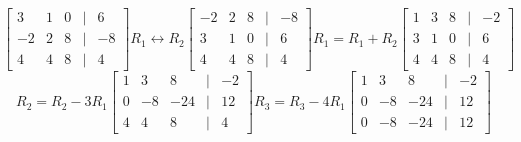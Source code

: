 \documentclass[11pt]{article}
\begin{document}
\begin{enumerate}
\begin{enumerate}
    \[
        \begin{bmatrix}
            3 & 1 & 0 &|& 6 \\
            -2 & 2 & 8 &|& -8 \\
            4 & 4 & 8 & |&4
        \end{bmatrix}
        R_1 \leftrightarrow R_2
        \begin{bmatrix}
            -2 & 2 & 8 &|& -8 \\
            3 & 1 & 0 &|& 6 \\
            4 & 4 & 8 & |&4
        \end{bmatrix}
        R_1 = R_1 + R_2
        \begin{bmatrix}
            1 & 3 & 8 &|& -2 \\
            3 & 1 & 0 &|& 6 \\
            4 & 4 & 8 & |&4
        \end{bmatrix}
    \]
    \[
        R_2 = R_2 - 3R_1
        \begin{bmatrix}
            1 & 3 & 8 &|& -2 \\
            0 & -8 & -24 &|& 12 \\
            4 & 4 & 8 & |&4
        \end{bmatrix}
        R_3 = R_3 - 4R_1
        \begin{bmatrix}
            1 & 3 & 8 &|& -2 \\
            0 & -8 & -24 &|& 12 \\
            0 & -8 & -24 & |&12
        \end{bmatrix}
    \]


\end{enumerate}
\end{enumerate}
\end{document}

